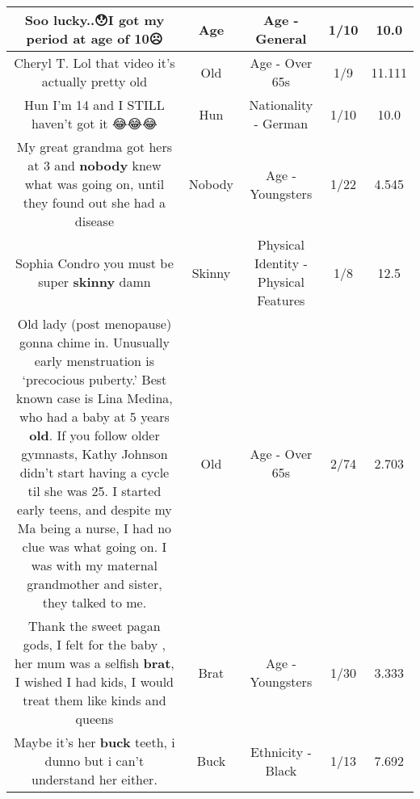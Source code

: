 \documentclass[11pt]{article}
\newlength\mylength
\begin{document}
\begin{center}
\begin{longtable}{|C{.65\mylength}|C{.30\mylength}|C{.12\mylength}|C{.12\mylength}|C{.12\mylength}|}
  \small Soo lucky..😯I got my period at \textbf{age} of 10☹\normalsize   & Age & Age - General & 1/10 & 10.0 \\  \hline
  \small Cheryl T. Lol that video it's actually pretty old\normalsize   & Old & Age - Over 65s & 1/9 & 11.111 \\  \hline
  \small Hun I'm 14 and I STILL haven't got it 😂😂😂\normalsize   & Hun & Nationality - German & 1/10 & 10.0 \\  \hline
  \small My great grandma got hers at 3 and \textbf{nobody} knew what was going on, until they found out she had a disease\normalsize   & Nobody & Age - Youngsters & 1/22 & 4.545 \\  \hline
  \small Sophia Condro you must be super \textbf{skinny} damn\normalsize   & Skinny & Physical Identity - Physical Features & 1/8 & 12.5 \\  \hline
  \small Old lady (post menopause) gonna chime in. Unusually early menstruation is ‘precocious puberty.' Best known case is Lina Medina, who had a baby at 5 years \textbf{old}. If you follow older gymnasts, Kathy Johnson didn't start having a cycle til she was 25. I started early teens, and despite my Ma being a nurse, I had no clue was what going on. I was with my maternal grandmother and sister, they talked to me.\normalsize   & Old & Age - Over 65s & 2/74 & 2.703 \\  \hline
  \small Thank the sweet pagan gods, I felt for the baby , her mum was a selfish \textbf{brat}, I wished I had kids, I would treat them like kinds and queens\normalsize   & Brat & Age - Youngsters & 1/30 & 3.333 \\  \hline
  \small Maybe it's her \textbf{buck} teeth, i dunno but i can't understand her either.\normalsize   & Buck & Ethnicity - Black & 1/13 & 7.692 \\  \hline

\end{longtable}
\end{center}
\end{document}
